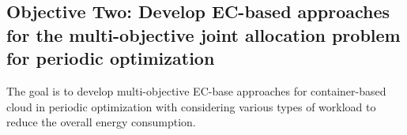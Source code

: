 \subsection{Objective Two: Develop EC-based approaches for the multi-objective joint allocation problem for periodic optimization}
The goal is to develop multi-objective EC-base approaches for container-based cloud in periodic optimization with considering various types of workload to reduce the overall energy consumption.


